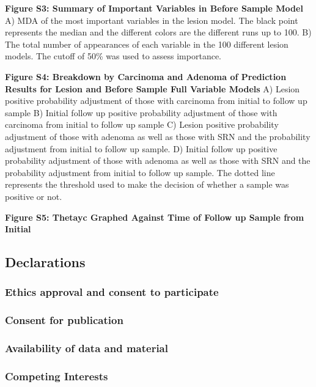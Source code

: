 \documentclass[12pt,]{article}
\begin{document}
\textbf{Figure S3: Summary of Important Variables in Before Sample
Model} A) MDA of the most important variables in the lesion model. The
black point represents the median and the different colors are the
different runs up to 100. B) The total number of appearances of each
variable in the 100 different lesion models. The cutoff of 50\% was used
to assess importance.

\textbf{Figure S4: Breakdown by Carcinoma and Adenoma of Prediction
Results for Lesion and Before Sample Full Variable Models} A) Lesion
positive probability adjustment of those with carcinoma from initial to
follow up sample B) Initial follow up positive probability adjustment of
those with carcinoma from initial to follow up sample C) Lesion positive
probability adjustment of those with adenoma as well as those with SRN
and the probability adjustment from initial to follow up sample. D)
Initial follow up positive probability adjustment of those with adenoma
as well as those with SRN and the probability adjustment from initial to
follow up sample. The dotted line represents the threshold used to make
the decision of whether a sample was positive or not.

\textbf{Figure S5: Thetayc Graphed Against Time of Follow up Sample from
Initial}

\newpage

\subsection{Declarations}\label{declarations}

\subsubsection{Ethics approval and consent to
participate}\label{ethics-approval-and-consent-to-participate}

\subsubsection{Consent for publication}\label{consent-for-publication}

\subsubsection{Availability of data and
material}\label{availability-of-data-and-material}

\subsubsection{Competing Interests}\label{competing-interests}
\end{document}
